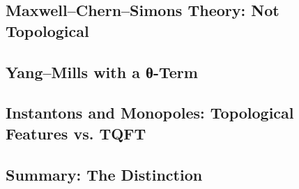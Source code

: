 \subsection{Maxwell--Chern--Simons Theory: Not Topological}

%
%


\subsection{Yang--Mills with a θ-Term}


\subsection{Instantons and Monopoles: Topological Features vs. TQFT}

%
%
%

\subsection{Summary: The Distinction}

%
%
